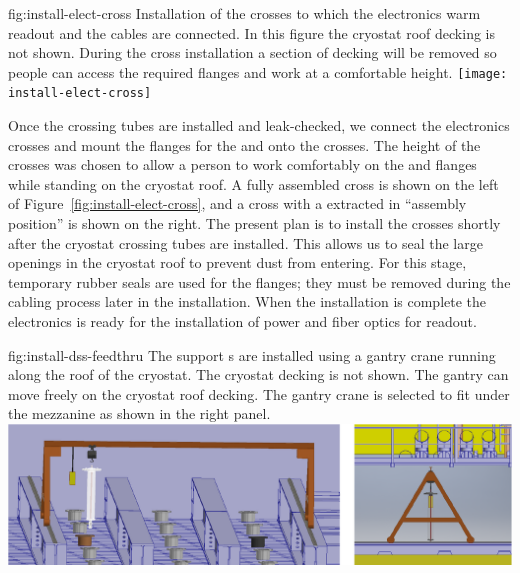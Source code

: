 \begin{dunefigure}{fig:install-elect-cross}
  {Installation of the crosses to which the  electronics warm readout and the  cables are connected. In this figure the cryostat roof decking is not shown. During the cross installation a section of decking will be removed so people can access the required flanges and work at a comfortable height.  }
 \texttt{[image: install-elect-cross]}
\end{dunefigure}



Once the crossing tubes are installed and leak-checked, we connect the   electronics crosses and mount  the  \fdth flanges for the  and  onto the crosses. 
The height of the crosses was chosen to allow a person to work comfortably on the   and  flanges while standing on the cryostat roof. 
A fully assembled cross is shown on the left of Figure~\ref{fig:install-elect-cross}, and a cross with a  extracted in ``assembly position'' is shown on the right. 
The present plan is to install the crosses shortly after the cryostat crossing tubes are installed. 
This allows us to seal the large openings in the cryostat roof to prevent dust from entering.
For this stage, temporary rubber seals are used for the flanges; they must be removed during the cabling process later in the installation. 
When the  installation is complete the  electronics is ready for the installation of power and fiber optics for readout. 

\begin{dunefigure}{fig:install-dss-feedthru}
  {The  support \fdth{}s  are installed using a gantry crane running along the roof of the cryostat.
  The cryostat decking is not shown. 
  The gantry can move freely on the cryostat roof decking. The gantry crane is selected to fit under the mezzanine as shown in the right panel.
  }
  \includegraphics[width=.98\textwidth]{graphics/install-dss-feedthru-v2.pdf}
\end{dunefigure}


